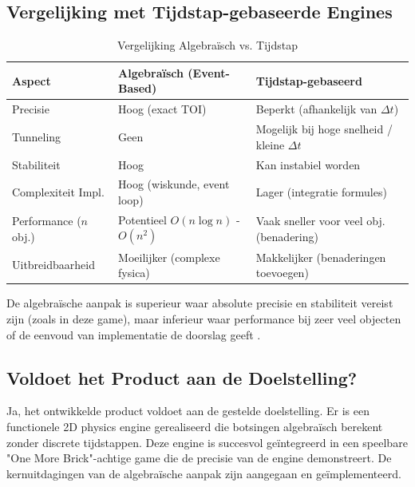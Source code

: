 \documentclass[11pt, a4paper]{article}
\begin{document}
\subsection{Vergelijking met Tijdstap-gebaseerde Engines}
\begin{table}[h]
\centering
\caption{Vergelijking Algebraïsch vs. Tijdstap}
\label{tab:vergelijking}
\begin{tabular}{@{}lll@{}}
\toprule
Aspect             & Algebraïsch (Event-Based)                    & Tijdstap-gebaseerd                        \\ \midrule
Precisie           & Hoog (exact TOI)                             & Beperkt (afhankelijk van $\Delta t$)      \\
Tunneling          & Geen                                         & Mogelijk bij hoge snelheid / kleine $\Delta t$ \\
Stabiliteit        & Hoog                                         & Kan instabiel worden                      \\
Complexiteit Impl. & Hoog (wiskunde, event loop)                & Lager (integratie formules)             \\
Performance ($n$ obj.) & Potentieel $O(n \log n)$ - $O(n^2)$      & Vaak sneller voor veel obj. (benadering) \\
Uitbreidbaarheid   & Moeilijker (complexe fysica)                 & Makkelijker (benaderingen toevoegen)      \\ \bottomrule
\end{tabular}
\end{table}
De algebraïsche aanpak is superieur waar absolute precisie en stabiliteit vereist zijn (zoals in deze game), maar inferieur waar performance bij zeer veel objecten of de eenvoud van implementatie de doorslag geeft \parencite{CollisionDetectionWiki}.

\subsection{Voldoet het Product aan de Doelstelling?}
Ja, het ontwikkelde product voldoet aan de gestelde doelstelling. Er is een functionele 2D physics engine gerealiseerd die botsingen algebraïsch berekent zonder discrete tijdstappen. Deze engine is succesvol geïntegreerd in een speelbare "One More Brick"-achtige game die de precisie van de engine demonstreert. De kernuitdagingen van de algebraïsche aanpak zijn aangegaan en geïmplementeerd.

\end{document}
